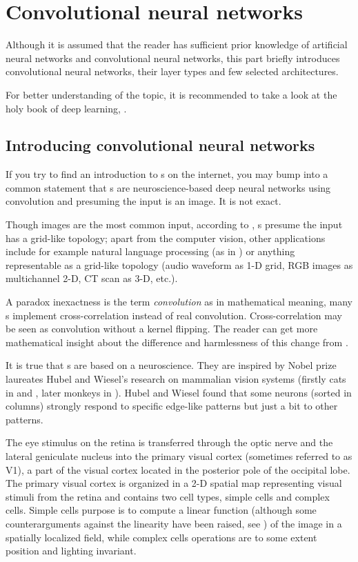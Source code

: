 \chapter{Convolutional neural networks}
\label{cnn}


Although it is assumed that the reader has sufficient prior knowledge of 
artificial neural networks and convolutional neural networks, this part briefly 
introduces convolutional neural networks, their layer types and few selected 
architectures. 

For better understanding of the topic, it is recommended to take a look at the 
holy book of deep learning, \cite{dl}.

\section{Introducing convolutional neural networks}
\label{understanding-cnn}

If you try to find an introduction to s on the internet, you may bump 
into a common statement that s are neuroscience-based deep neural 
networks using convolution and presuming the input is an image. It is not 
exact. 

Though images are the most common input, according to \cite{dl}, s 
presume the input has a grid-like topology; apart from the computer vision, 
other applications include  for example natural language processing (as in 
\cite{cnn-nlp}) or anything representable as a grid-like topology (audio 
waveform as 1-D grid, RGB images as multichannel 2-D, CT scan as 3-D, etc.). 

A paradox inexactness is the term \textit{convolution} as in mathematical 
meaning, many s implement cross-correlation instead of real convolution. 
Cross-correlation may be seen as convolution without a kernel flipping. The 
reader can get more mathematical insight about the difference and harmlessness 
of this change from \cite{dl}. 

It is true that s are based on a neuroscience. They are inspired by 
Nobel prize laureates Hubel and Wiesel's research on mammalian vision systems 
(firstly cats in \cite{hubel-cats1} and \cite{hubel-cats2}, later monkeys in 
\cite{hubel-monkeys}). Hubel and Wiesel found that some neurons (sorted in 
columns) strongly respond to specific edge-like patterns but just a 
bit to other patterns. 

The eye stimulus on the retina is transferred through the optic nerve and the 
lateral geniculate nucleus into the primary visual cortex (sometimes referred to 
as V1), a part of the visual cortex located in the posterior pole of the 
occipital lobe. The primary visual cortex is organized in a 2-D spatial map 
representing visual stimuli from the retina and contains two cell types, simple 
cells and complex cells. Simple cells purpose is to compute a linear function 
(although some counterarguments against the linearity have been raised, see 
\cite{simple-cells}) of the image in a spatially localized field, while complex 
cells operations are to some extent position and lighting invariant. 

